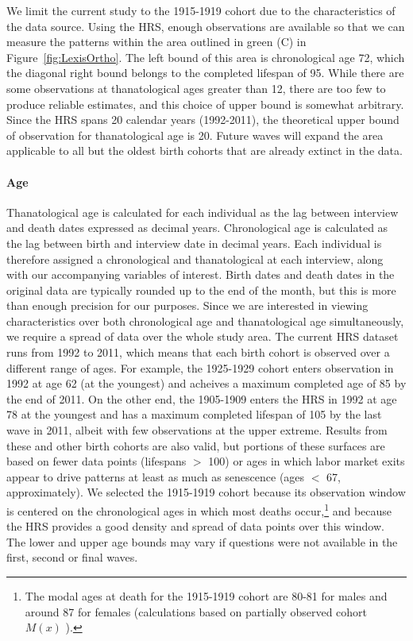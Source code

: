 \documentclass{article}
\begin{document}
We limit the current study to the 1915-1919 cohort due
to the characteristics of the data source. Using the HRS, enough
observations are available so that we can measure the patterns
within the area outlined in green (C) in Figure~\ref{fig:LexisOrtho}. The
left bound of this area is chronological age 72, which the diagonal right
bound belongs to the completed lifespan of 95. While there are some observations
at thanatological ages greater than 12, there are too few to produce reliable estimates, and this choice of upper bound is somewhat arbitrary. Since the HRS spans 20 calendar years (1992-2011), the theoretical
upper bound of observation for thanatological age is 20. Future waves will
expand the area applicable to all but the oldest birth cohorts that are already
extinct in the data.

\paragraph*{Age}
Thanatological age is calculated for each individual as the lag between
interview and death dates expressed as decimal years. Chronological age is
calculated as the lag between birth and interview date in decimal years. Each
individual is therefore assigned a chronological and thanatological at each
interview, along with our accompanying variables of interest.
Birth dates and death dates in the original data are typically rounded up to the end
of the month, but this is more than enough precision for our purposes. Since we
are interested in viewing characteristics over both chronological age and
thanatological age simultaneously, we require a spread of data over
the whole study area. 
The current HRS dataset runs from 1992 to 2011, which
means that each birth cohort is observed over a different range of ages. For
example, the 1925-1929 cohort enters observation in 1992 at age 62 (at the
youngest) and acheives a maximum completed age of 85 by the end of 2011. On the
other end, the 1905-1909 enters the HRS in 1992 at age 78 at the youngest and
has a maximum completed lifespan of 105 by the last wave in 2011, albeit with
few observations at the upper extreme. Results from these and other birth cohorts are also
valid, but portions of these surfaces are based on fewer data points (lifespans $>$ 100) or ages in which labor market
exits appear to drive patterns at least as much as senescence (ages $<$ 67,
approximately). We selected the 1915-1919 cohort because
its observation window is centered on the chronological ages in which most
deaths occur,\footnote{The modal ages at death for the 1915-1919 cohort are
80-81 for males and around 87 for females (calculations based
on partially observed cohort $M(x)$ \citep{HMD}).} and because the HRS
provides a good density and spread of data points over this window. The lower
and upper age bounds may vary if questions were not available in the first,
second or final waves.
\end{document}
